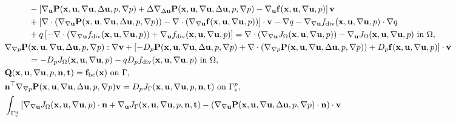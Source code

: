 \documentclass[oneside]{book}
\numberwithin{equation}{section}
\begin{document}
\begin{itemize}[leftmargin=0in]
\begin{equation}
{\begin{split}
            &\hspace{1cm}- \left[\nabla_{\bf u}{\bf P}({\bf x},{\bf u},\nabla{\bf u},\Delta{\bf u},p,\nabla p) + \Delta\nabla_{\Delta{\bf u}}{\bf P}({\bf x},{\bf u},\nabla{\bf u},\Delta{\bf u},p,\nabla p) - \nabla_{\bf u}{\bf f}({\bf x},{\bf u},\nabla{\bf u},p)\right]{\bf v}\\
            &\hspace{1cm}+ \left[\nabla\cdot\left(\nabla_{\nabla{\bf u}}{\bf P}({\bf x},{\bf u},\nabla{\bf u},\Delta{\bf u},p,\nabla p)\right) - \nabla\cdot\left(\nabla_{\nabla{\bf u}}{\bf f}({\bf x},{\bf u},\nabla{\bf u},p)\right)\right]\cdot{\bf v} - \nabla q - \nabla_{\nabla{\bf u}}f_{\rm div}({\bf x},{\bf u},\nabla{\bf u},p)\cdot\nabla q\\
            &\hspace{1cm}+ q\left[-\nabla\cdot\left(\nabla_{\nabla{\bf u}}f_{\rm div}({\bf x},{\bf u},\nabla{\bf u},p)\right) + \nabla_{\bf u}f_{\rm div}({\bf x},{\bf u},\nabla{\bf u},p)\right] = \nabla\cdot\left(\nabla_{\nabla{\bf u}}J_\Omega({\bf x},{\bf u},\nabla{\bf u},p)\right) - \nabla_{\bf u}J_\Omega({\bf x},{\bf u},\nabla{\bf u},p) \mbox{ in } \Omega,\\
            &\nabla_{\nabla p}{\bf P}({\bf x},{\bf u},\nabla{\bf u},\Delta{\bf u},p,\nabla p):\nabla{\bf v} + \left[-D_p{\bf P}({\bf x},{\bf u},\nabla{\bf u},\Delta{\bf u},p,\nabla p) + \nabla\cdot\left(\nabla_{\nabla p}{\bf P}({\bf x},{\bf u},\nabla{\bf u},\Delta{\bf u},p,\nabla p)\right) + D_p{\bf f}({\bf x},{\bf u},\nabla{\bf u},p)\right]\cdot{\bf v}\\
            &\hspace{1cm} = - D_pJ_\Omega ({\bf x},{\bf u},\nabla{\bf u},p) - qD_pf_{\rm div}({\bf x},{\bf u},\nabla{\bf u},p) \mbox{ in } \Omega,\\
            &{\bf Q}({\bf x},{\bf u},\nabla{\bf u},p,{\bf n},{\bf t}) = {\bf f}_{\rm bc}({\bf x}) \mbox{ on } \Gamma,\\
            &{\bf n}^\top\nabla_{\nabla p}{\bf P}({\bf x},{\bf u},\nabla{\bf u},\Delta{\bf u},p,\nabla p){\bf v} = D_pJ_\Gamma({\bf x},{\bf u},\nabla{\bf u},p,{\bf n},{\bf t}) \mbox{ on } \Gamma_{\rm v}^p,\\
            &\int_{\Gamma_{\rm v}^{\bf u}} \left[\nabla_{\nabla{\bf u}}J_\Omega({\bf x},{\bf u},\nabla{\bf u},p)\cdot{\bf n} + \nabla_{\bf u}J_\Gamma({\bf x},{\bf u},\nabla{\bf u},p,{\bf n},{\bf t}) - \left(\nabla_{\nabla{\bf u}}{\bf P}({\bf x},{\bf u},\nabla{\bf u},\Delta{\bf u},p,\nabla p)\cdot{\bf n}\right)\cdot{\bf v}\right.\\

\end{split}}
\end{equation}
\end{itemize}
\end{document}
